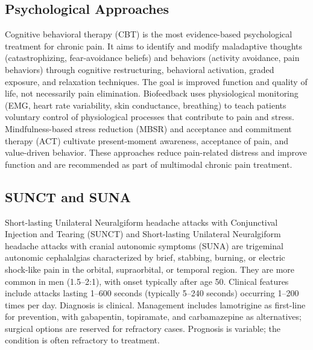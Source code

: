 
\label{sec:Pain Management Principles}

\subsection{Psychological Approaches}
\label{sec:Psychological Approaches}

Cognitive behavioral therapy (CBT) is the most evidence-based psychological treatment for chronic pain. It aims to identify and modify maladaptive thoughts (catastrophizing, fear-avoidance beliefs) and behaviors (activity avoidance, pain behaviors) through cognitive restructuring, behavioral activation, graded exposure, and relaxation techniques. The goal is improved function and quality of life, not necessarily pain elimination. Biofeedback uses physiological monitoring (EMG, heart rate variability, skin conductance, breathing) to teach patients voluntary control of physiological processes that contribute to pain and stress. Mindfulness-based stress reduction (MBSR) and acceptance and commitment therapy (ACT) cultivate present-moment awareness, acceptance of pain, and value-driven behavior. These approaches reduce pain-related distress and improve function and are recommended as part of multimodal chronic pain treatment.

\subsection{SUNCT and SUNA}
\label{sec:SUNCT SUNA}
Short-lasting Unilateral Neuralgiform headache attacks with Conjunctival Injection and Tearing (SUNCT) and Short-lasting Unilateral Neuralgiform headache attacks with cranial autonomic symptoms (SUNA) are trigeminal autonomic cephalalgias characterized by brief, stabbing, burning, or electric shock-like pain in the orbital, supraorbital, or temporal region. They are more common in men (1.5--2:1), with onset typically after age 50. Clinical features include attacks lasting 1--600 seconds (typically 5--240 seconds) occurring 1--200 times per day. Diagnosis is clinical. Management includes lamotrigine as first-line for prevention, with gabapentin, topiramate, and carbamazepine as alternatives; surgical options are reserved for refractory cases. Prognosis is variable; the condition is often refractory to treatment.


